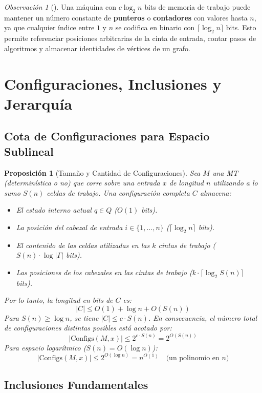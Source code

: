 \documentclass[11pt, a4paper]{article}
\theoremstyle{definition}
\theoremstyle{plain}
\newtheorem{proposicion}[definicion]{Proposición}
\theoremstyle{remark}
\newtheorem{observacion}[definicion]{Observación}
\begin{document}
\begin{observacion}[]
Una máquina con $c \log_2 n$ bits de memoria de trabajo puede mantener un número constante de \textbf{punteros} o \textbf{contadores} con valores hasta $n$, ya que cualquier índice entre $1$ y $n$ se codifica en binario con $\lceil \log_2 n \rceil$ bits. Esto permite referenciar posiciones arbitrarias de la cinta de entrada, contar pasos de algoritmos y almacenar identidades de vértices de un grafo.
\end{observacion}

\section{Configuraciones, Inclusiones y Jerarquía}

\subsection{Cota de Configuraciones para Espacio Sublineal}

\begin{proposicion}[Tamaño y Cantidad de Configuraciones]
Sea $M$ una MT (determinística o no) que corre sobre una entrada $x$ de longitud $n$ utilizando a lo sumo $S(n)$ celdas de trabajo. Una configuración completa $C$ almacena:
\begin{itemize}
    \item El estado interno actual $q \in Q$ ($O(1)$ bits).
    \item La posición del cabezal de entrada $i \in \{1, \dots, n\}$ ($\lceil \log_2 n \rceil$ bits).
    \item El contenido de las celdas utilizadas en las $k$ cintas de trabajo ($S(n) \cdot \log |\Gamma|$ bits).
    \item Las posiciones de los cabezales en las cintas de trabajo ($k \cdot \lceil \log_2 S(n) \rceil$ bits).
\end{itemize}
Por lo tanto, la longitud en bits de $C$ es:
\[
|C| \le O(1) + \log n + O(S(n))
\]
Para $S(n) \ge \log n$, se tiene $|C| \le c \cdot S(n)$. En consecuencia, el número total de configuraciones distintas posibles está acotado por:
\[
|\text{Configs}(M, x)| \le 2^{c \cdot S(n)} = 2^{O(S(n))}
\]
Para espacio logarítmico ($S(n) = O(\log n)$):
\[
|\text{Configs}(M, x)| \le 2^{O(\log n)} = n^{O(1)} \quad \text{(un polinomio en $n$)}
\]
\end{proposicion}

\subsection{Inclusiones Fundamentales}
\end{document}
